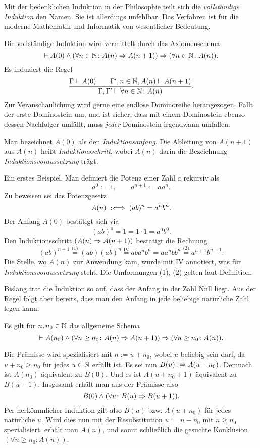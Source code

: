 Mit der bedenklichen Induktion in der Philosophie teilt sich die
\emph{vollständige Induktion} den Namen. Sie ist allerdings unfehlbar.
Das Verfahren ist für die moderne Mathematik und Informatik von
wesentlicher Bedeutung.

Die vollständige Induktion wird vermittelt durch das Axiomenschema
\[\vdash A(0)\land (\forall n\in\mathbb N\colon A(n)\Rightarrow A(n+1))
\Rightarrow (\forall n\in\mathbb N\colon A(n)).\]
Es induziert die Regel
\[\dfrac{\Gamma\vdash A(0)\qquad\Gamma',n\in\mathbb N,A(n)\vdash A(n+1)}{
\Gamma,\Gamma'\vdash\forall n\in\mathbb N\colon A(n)}.\]
Zur Veranschaulichung wird gerne eine endlose Dominoreihe herangezogen.
Fällt der erste Dominostein um, und ist sicher, dass mit einem
Dominostein ebenso dessen Nachfolger umfällt, muss \emph{jeder}
Dominostein irgendwann umfallen.

Man bezeichnet $A(0)$ als den \emph{Induktionsanfang}.
Die Ableitung von $A(n+1)$ aus $A(n)$ heißt \emph{Induktionsschritt},
wobei $A(n)$ darin die Bezeichnung \emph{Induktionsvoraussetzung} trägt.

Ein erstes Beispiel. Man definiert die Potenz einer Zahl $a$ rekursiv als
\[a^0 := 1,\qquad a^{n+1} := aa^n.\]
Zu beweisen sei das Potenzgesetz
\[A(n)\;:\Longleftrightarrow\; (ab)^n = a^n b^n.\]
Der Anfang $A(0)$ bestätigt sich via
\[(ab)^0 = 1 = 1\cdot 1 = a^0 b^0.\]
Den Induktionsschritt $(A(n)\Rightarrow A(n+1))$ bestätigt
die Rechnung
\[(ab)^{n+1}\stackrel{\text{(1)}}= (ab)(ab)^n
\stackrel{\text{IV}}= aba^n b^n = aa^n bb^n
\stackrel{\text{(2)}}= a^{n+1} b^{n+1}.\]
Die Stelle, wo $A(n)$ zur Anwendung kam, wurde mit IV annotiert,
was für \emph{Induktionsvoraussetzung} steht. Die Umformungen
(1), (2) gelten laut Definition.

Bislang trat die Induktion so auf, dass der Anfang in der
Zahl Null liegt. Aus der Regel folgt aber bereits, dass man den
Anfang in jede beliebige natürliche Zahl legen kann.
\begin{Satz}
Es gilt für $n,n_0\in\mathbb N$ das allgemeine Schema
\[\vdash A(n_0)\land (\forall n\ge n_0\colon A(n)\Rightarrow A(n+1))
\Rightarrow (\forall n\ge n_0\colon A(n)).\]
\end{Satz}
\begin{Beweis}
Die Prämisse wird spezialisiert mit $n:=u+n_0$, wobei $u$ beliebig sein
darf, da $u+n_0\ge n_0$ für jedes $u\in\mathbb N$
erfüllt ist. Es sei nun $B(u):\Leftrightarrow A(u+n_0)$. Demnach ist
$A(n_0)$ äquivalent zu $B(0)$. Und es ist $A(u+n_0+1)$ äquivalent
zu $B(u+1)$. Insgesamt erhält man aus der Prämisse also
\[B(0)\land (\forall u\colon B(u)\Rightarrow B(u+1)).\]
Per herkömmlicher Induktion gilt also $B(u)$ bzw. $A(u+n_0)$ für
jedes natürliche $u$. Wird dies nun mit der Resubstitution $u:=n-n_0$
mit $n\ge n_0$ spezialisiert, erhält man $A(n)$, und somit schließlich die
gesuchte Konklusion $(\forall n\ge n_0\colon A(n))$.\,\qedsymbol
\end{Beweis}

